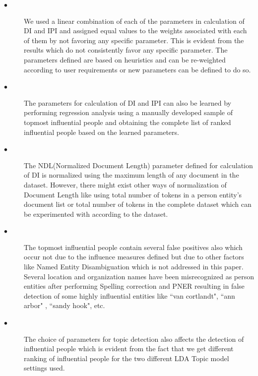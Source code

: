 \documentclass[10pt,journal,compsoc]{IEEEtran}
\begin{document}
\begin{description}
\item[$\bullet$]\noindent
We used a linear combination of each of the parameters in calculation of DI and IPI and assigned equal values to the weights associated with each of them by not favoring any specific parameter. This is evident from the results which do not consistently favor any specific parameter. The parameters defined are based on heuristics and can be re-weighted according to user requirements or new parameters can be defined to do so. 

\item[$\bullet$]\noindent
The parameters for calculation of DI and IPI can also be learned by performing regression analysis using a manually developed sample of topmost influential people and obtaining the complete list of ranked influential people based on the learned parameters.

\item[$\bullet$]\noindent
The NDL(Normalized Document Length) parameter defined for calculation of DI is normalized using the maximum length of any document in the dataset. However, there might exist other ways of normalization of Document Length like using total number of tokens in a person entity's document list or total number of tokens in the complete dataset which can be experimented with according to the dataset.

\item[$\bullet$]\noindent
The topmost influential people contain several false positives also which occur not due to the influence measures defined but due to other factors like Named Entity Disambiguation which is not addressed in this paper. Several location and organization names have been misrecognized as person entities after performing Spelling correction and PNER resulting in false detection of some highly influential entities like ``van cortlandt", ``ann arbor" , ``sandy hook", etc.  

\item[$\bullet$] \noindent
The choice of parameters for topic detection also affects the detection of influential people which is evident from the fact that we get different ranking of influential people for the two different LDA Topic model settings used. 

\end{description}
\end{document}
